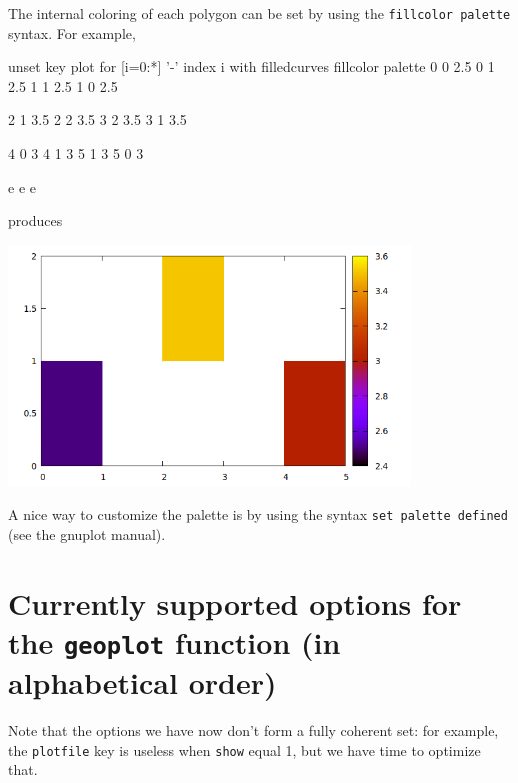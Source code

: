 \documentclass{article}
\begin{document}
\medskip

The internal coloring of each polygon can be set by using the
\texttt{fillcolor palette} syntax. For example,
\begin{scriptsize}
\begin{code}
unset key
plot for [i=0:*] '-' index i with filledcurves fillcolor palette
	0 0 2.5 
	0 1 2.5
	1 1 2.5
	1 0 2.5

	2 1 3.5 
	2 2 3.5
	3 2 3.5
	3 1 3.5

	4 0 3 
	4 1 3
	5 1 3
	5 0 3

e
e
e        
\end{code}
\end{scriptsize}
produces
\begin{center}
  \includegraphics[width=0.8\textwidth]{squares}
\end{center}

A nice way to customize the palette is by using the syntax \texttt{set
palette defined} (see the gnuplot manual).

\section{Currently supported options for the \texttt{geoplot} function
(in alphabetical order)}
\label{sec:opts}

Note that the options we have now don't form a fully coherent set: for
example, the \texttt{plotfile} key is useless when \texttt{show} equal
1, but we have time to optimize that.
\end{document}
